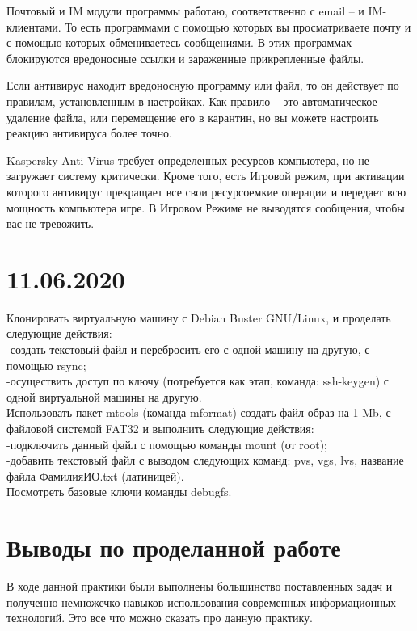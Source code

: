 \documentclass[a4paper,14pt]{extarticle}
\begin{document}
Почтовый и IM модули программы работаю, соответственно с email – и IM-клиентами. То есть программами с помощью которых вы просматриваете почту и с помощью которых обмениваетесь сообщениями. В этих программах блокируются вредоносные ссылки и зараженные прикрепленные файлы. 

Если антивирус находит вредоносную программу или файл, то он действует по правилам, установленным в настройках. Как правило – это автоматическое удаление файла, или перемещение его в карантин, но вы можете настроить реакцию антивируса более точно.

Kaspersky Anti-Virus требует определенных ресурсов компьютера, но не загружает систему критически. Кроме того, есть Игровой режим, при активации которого антивирус прекращает все свои ресурсоемкие операции и передает всю мощность компьютера игре. В Игровом Режиме не выводятся сообщения, чтобы вас не тревожить.\cite{kasav}
\newpage
\section{11.06.2020}
Клонировать виртуальную машину с Debian Buster GNU/Linux, и проделать следующие действия:\\
        -создать текстовый файл и перебросить его с одной машину на другую, с помощью rsync;\\
        -осуществить доступ по ключу (потребуется как этап, команда: ssh-keygen) с одной виртуальной машины на другую.\\

Использовать пакет mtools (команда mformat) создать файл-образ на 1 Mb, с файловой системой FAT32 и выполнить следующие действия:\\
        -подключить данный файл с помощью команды mount (от root);\\
        -добавить текстовый файл с выводом следующих команд: pvs, vgs, lvs, название файла ФамилияИО.txt (латиницей).\\

Посмотреть базовые ключи команды debugfs.
\section{Выводы по проделанной работе}
В ходе данной практики были выполнены большинство поставленных задач и полученно немножечко навыков использования современных информационных технологий.  Это все что можно сказать про данную практику.\\
\end{document}
